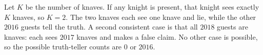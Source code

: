 Let $K$ be the number of knaves. If any knight is present, that knight sees exactly $K$ knaves, so $K=2$. The two knaves each see one knave and lie, while the other $2016$ guests tell the truth. A second consistent case is that all $2018$ guests are knaves: each sees $2017$ knaves and makes a false claim. No other case is possible, so the possible truth-teller counts are $\boxed{0\text{ or }2016}$.
